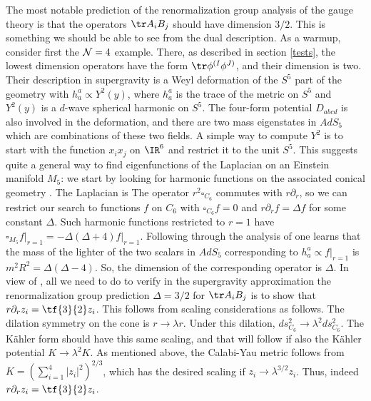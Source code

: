 The most notable prediction of the renormalization group analysis of the
gauge theory is that the operators $\tr A_i B_j$ should have dimension
$3/2$.  This is something we should be able to see from the dual 
description.  As a
warmup, consider first the ${\cal N}=4$ example.  There, as described
in section \ref{tests}, the lowest
dimension operators have the form $\tr \phi^{(I} \phi^{J)}$, 
and their dimension
is two.  Their description in supergravity is a Weyl deformation of the
$S^5$ part of the geometry with $h^a_a \propto Y^2(y)$, 
where
$h^a_a$ is the trace of the metric on $S^5$ and $Y^2(y)$ is a
$d$-wave spherical harmonic on $S^5$.  The four-form potential
$D_{abcd}$ is also involved in the deformation, and
there are two mass eigenstates in $AdS_5$ which are combinations 
of these two 
fields.  A simple way to
compute $Y^2$ is to start with the function $x_i x_j$ on $\IR^6$ and
restrict it to the unit $S^5$.  This suggests quite a general way to find
eigenfunctions of the Laplacian on an Einstein manifold $M_5$: we start by
looking for harmonic functions on the associated conical geometry
\ConeForm.  The Laplacian is
 The operator $r^2 \square_{C_6}$ commutes with $r\partial_r$, so we can
restrict our search to functions $f$ on $C_6$ with $\square_{C_6} f = 0$
and $r\partial_r f = \Delta f$ for some constant $\Delta$.  Such
harmonic functions
restricted to $r=1$ have $\square_{M_5} f\Big|_{r=1} = -\Delta(\Delta+4)
f\Big|_{r=1}$.  Following through the analysis of \cite{Kim:1985ez} one
learns that the mass of the lighter of the two scalars in $AdS_5$
corresponding to $h^a_a \propto f\Big|_{r=1}$ is $m^2 R^2 =
\Delta(\Delta-4)$.  So, the dimension of the corresponding operator is
$\Delta$.  In view of \RecoverCon, all we need to do to verify
in the supergravity approximation
the renormalization group prediction $\Delta = 3/2$ for $\tr A_i B_j$ is to
show that $r \partial_r z_i = \tf{3}{2} z_i$.  This follows from scaling
considerations as follows.  The dilation symmetry on the cone is $r \to
\lambda r$.  Under this dilation, $ds_{C_6}^2 \to \lambda^2 ds_{C_6}^2$.
The K\"ahler form should have this same scaling, and that will follow if also
the K\"ahler potential $K \to \lambda^2 K$.  As mentioned above, the
Calabi-Yau metric follows from $K = \left( \sum_{i=1}^4 |z_i|^2
\right)^{2/3}$, which has the desired scaling if $z_i \to \lambda^{3/2}
z_i$.  Thus, indeed $r\partial_r z_i = \tf{3}{2} z_i$.

